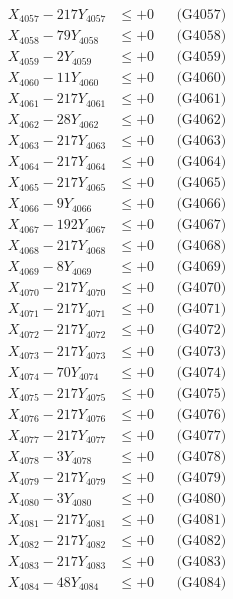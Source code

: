 \documentclass[a4paper,10pt]{article}
\begin{document}
{\begin{align}
X_{4057} - 217Y_{4057} &\leq +0 && \text{(G4057)} \\
X_{4058} - 79Y_{4058} &\leq +0 && \text{(G4058)} \\
X_{4059} - 2Y_{4059} &\leq +0 && \text{(G4059)} \\
X_{4060} - 11Y_{4060} &\leq +0 && \text{(G4060)} \\
\allowbreak
X_{4061} - 217Y_{4061} &\leq +0 && \text{(G4061)} \\
X_{4062} - 28Y_{4062} &\leq +0 && \text{(G4062)} \\
X_{4063} - 217Y_{4063} &\leq +0 && \text{(G4063)} \\
X_{4064} - 217Y_{4064} &\leq +0 && \text{(G4064)} \\
X_{4065} - 217Y_{4065} &\leq +0 && \text{(G4065)} \\
X_{4066} - 9Y_{4066} &\leq +0 && \text{(G4066)} \\
X_{4067} - 192Y_{4067} &\leq +0 && \text{(G4067)} \\
X_{4068} - 217Y_{4068} &\leq +0 && \text{(G4068)} \\
X_{4069} - 8Y_{4069} &\leq +0 && \text{(G4069)} \\
X_{4070} - 217Y_{4070} &\leq +0 && \text{(G4070)} \\
\allowbreak
X_{4071} - 217Y_{4071} &\leq +0 && \text{(G4071)} \\
X_{4072} - 217Y_{4072} &\leq +0 && \text{(G4072)} \\
X_{4073} - 217Y_{4073} &\leq +0 && \text{(G4073)} \\
X_{4074} - 70Y_{4074} &\leq +0 && \text{(G4074)} \\
X_{4075} - 217Y_{4075} &\leq +0 && \text{(G4075)} \\
X_{4076} - 217Y_{4076} &\leq +0 && \text{(G4076)} \\
X_{4077} - 217Y_{4077} &\leq +0 && \text{(G4077)} \\
X_{4078} - 3Y_{4078} &\leq +0 && \text{(G4078)} \\
X_{4079} - 217Y_{4079} &\leq +0 && \text{(G4079)} \\
X_{4080} - 3Y_{4080} &\leq +0 && \text{(G4080)} \\
\allowbreak
X_{4081} - 217Y_{4081} &\leq +0 && \text{(G4081)} \\
X_{4082} - 217Y_{4082} &\leq +0 && \text{(G4082)} \\
X_{4083} - 217Y_{4083} &\leq +0 && \text{(G4083)} \\
X_{4084} - 48Y_{4084} &\leq +0 && \text{(G4084)} \\

\end{align}}
\end{document}
